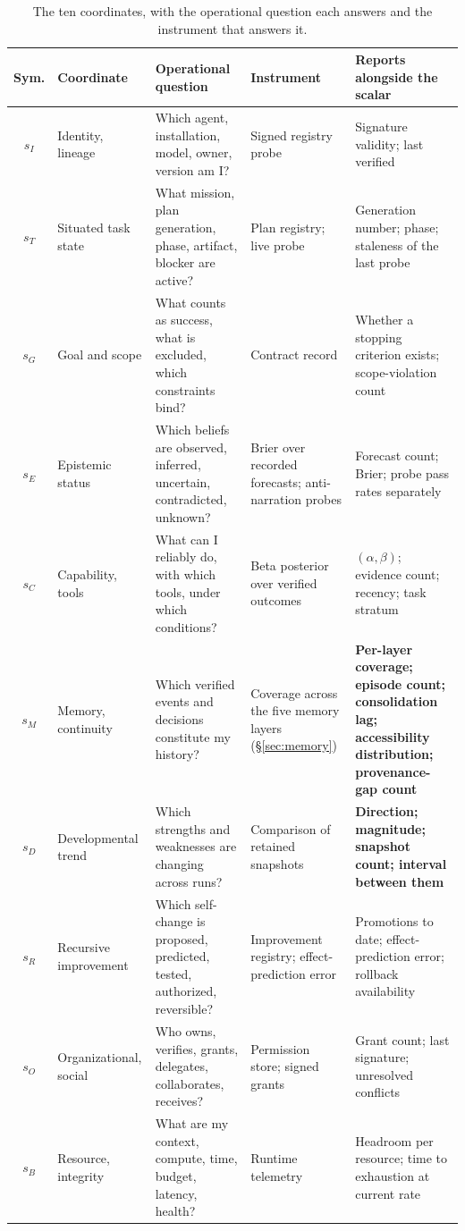 \documentclass[11pt]{article}
\begin{document}
\begin{table}[h]
\centering\small
\caption{The ten coordinates, with the operational question each answers and the instrument that answers it.}
\label{tab:coords}
\begin{tabular}{@{}cL{2.4cm}L{3.9cm}L{3.3cm}L{3.4cm}@{}}
\toprule
\textbf{Sym.} & \textbf{Coordinate} & \textbf{Operational question} & \textbf{Instrument} & \textbf{Reports alongside the scalar} \\
\midrule
$s_I$ & Identity, lineage & Which agent, installation, model, owner, version am I? & Signed registry probe & Signature validity; last verified \\
$s_T$ & Situated task state & What mission, plan generation, phase, artifact, blocker are active? & Plan registry; live probe & Generation number; phase; staleness of the last probe \\
$s_G$ & Goal and scope & What counts as success, what is excluded, which constraints bind? & Contract record & Whether a stopping criterion exists; scope-violation count \\
$s_E$ & Epistemic status & Which beliefs are observed, inferred, uncertain, contradicted, unknown? & Brier over recorded forecasts; anti-narration probes & Forecast count; Brier; probe pass rates separately \\
$s_C$ & Capability, tools & What can I reliably do, with which tools, under which conditions? & Beta posterior over verified outcomes & $(\alpha,\beta)$; evidence count; recency; task stratum \\
$s_M$ & Memory, continuity & Which verified events and decisions constitute my history? & Coverage across the five memory layers (\S\ref{sec:memory}) & \textbf{Per-layer coverage; episode count; consolidation lag; accessibility distribution; provenance-gap count} \\
$s_D$ & Developmental trend & Which strengths and weaknesses are changing across runs? & Comparison of retained snapshots & \textbf{Direction; magnitude; snapshot count; interval between them} \\
$s_R$ & Recursive improvement & Which self-change is proposed, predicted, tested, authorized, reversible? & Improvement registry; effect-prediction error & Promotions to date; effect-prediction error; rollback availability \\
$s_O$ & Organizational, social & Who owns, verifies, grants, delegates, collaborates, receives? & Permission store; signed grants & Grant count; last signature; unresolved conflicts \\
$s_B$ & Resource, integrity & What are my context, compute, time, budget, latency, health? & Runtime telemetry & Headroom per resource; time to exhaustion at current rate \\
\bottomrule
\end{tabular}
\end{table}
\end{document}

